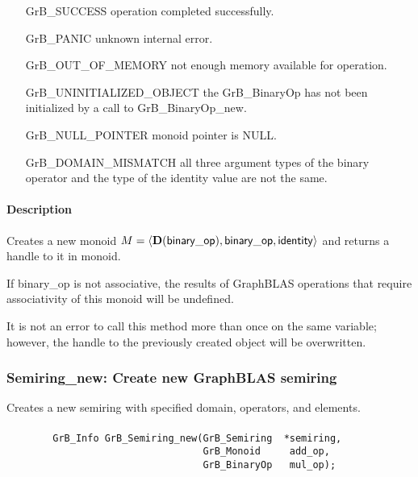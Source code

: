 \begin{itemize}[leftmargin=2.1in]
\item[{\sf GrB\_SUCCESS}]           operation completed successfully.
\item[{\sf GrB\_PANIC}]             unknown internal error.
\item[{\sf GrB\_OUT\_OF\_MEMORY}]   not enough memory available for operation.
\item[{\sf GrB\_UNINITIALIZED\_OBJECT}]  the {\sf GrB\_BinaryOp} has not been
                                    initialized by a call to {\sf GrB\_BinaryOp\_new}.
\item[{\sf GrB\_NULL\_POINTER}]     {\sf monoid} pointer is {\sf NULL}.
\item[{\sf GrB\_DOMAIN\_MISMATCH}]  all three argument types of the binary operator and
                                    the type of the identity value are not the same.
\end{itemize}

\paragraph{Description}

Creates a new monoid $M = \langle \mathbf{D}({\sf binary\_op}), {\sf binary\_op}, 
{\sf identity} \rangle$ and returns a handle to it in {\sf monoid}.

If {\sf binary\_op} is not associative, the results of GraphBLAS operations that
require associativity of this monoid will be undefined.

It is not an error to call this method more than once on the same variable;  
however, the handle to the previously created object will be overwritten. 

\subsubsection{{\sf Semiring\_new}: Create new GraphBLAS semiring}

Creates a new semiring with specified domain, operators, and elements.

\paragraph{\syntax}

\begin{verbatim}
        GrB_Info GrB_Semiring_new(GrB_Semiring  *semiring,
                                  GrB_Monoid     add_op,
                                  GrB_BinaryOp   mul_op);
\end{verbatim}

